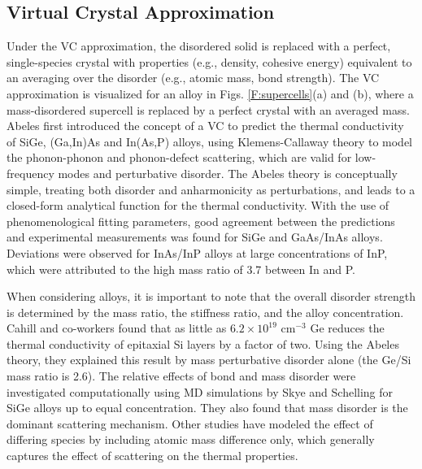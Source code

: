 \documentclass[aps,prb,onecolumn,preprint,footinbib,superscriptaddress,amsmath,amssymb,floatfix]{revtex4}
\begin{document}

\subsection{\label{S:Virtual Crystal}Virtual Crystal Approximation}

Under the VC approximation, the disordered solid is replaced with 
a perfect, single-species crystal with properties (e.g., density, 
cohesive energy) equivalent to an averaging over the disorder 
(e.g., atomic mass, bond strength).\cite{abeles_lattice_1963}
The VC approximation is visualized for an alloy in Figs. 
\ref{F:supercells}(a) and (b), where 
a mass-disordered supercell is replaced by a perfect 
crystal with an averaged mass. 
Abeles first introduced the concept of a VC to predict the
thermal conductivity of SiGe, (Ga,In)As and In(As,P) alloys,
\cite{abeles_lattice_1963} using  
Klemens-Callaway theory to model the phonon-phonon and phonon-defect 
scattering, 
which are valid for low-frequency modes and  
perturbative disorder.
\cite{abeles_lattice_1963,klemens_scattering_1955,
klemens_thermal_1957,callaway_model_1959,mattis_phonon_1957,
kamitakahara_vibrations_1974} 
The Abeles theory is conceptually simple, treating both
disorder and anharmonicity as perturbations, and leads to 
a closed-form analytical function for the thermal conductivity.
With the use of phenomenological  
fitting parameters, good agreement between the predictions and 
experimental measurements 
was found for SiGe and GaAs/InAs alloys. Deviations were observed 
for InAs/InP alloys at large concentrations of 
InP, which were attributed to the high mass ratio of 3.7 between 
In and P.\cite{abeles_lattice_1963}

When considering alloys, it is important to note that 
the overall disorder strength is determined by the mass ratio, 
the stiffness ratio, and the alloy concentration.
Cahill and co-workers found that as little as 
$6.2\times10^{19}$ cm$^{-3}$ Ge reduces the thermal conductivity of 
epitaxial Si layers by a factor of two.\cite{cahill_thermal_2004}  
Using the Abeles theory, they explained this result 
by mass perturbative disorder alone (the Ge/Si mass ratio is 2.6).
\cite{cahill_thermal_2004,cahill_thermal_2005} 
The relative effects of bond and mass disorder were investigated 
computationally using MD simulations by Skye and 
Schelling for SiGe alloys up to equal concentration.
\cite{skye_thermal_2008} They also found that mass disorder is 
the dominant scattering mechanism. Other studies have modeled the 
effect of differing species by including 
atomic mass difference only, which generally captures the effect of 
scattering on the thermal properties.
\cite{landry_complex_2008,landry_thermal_2009,tian_enhancing_2012}
\end{document}

